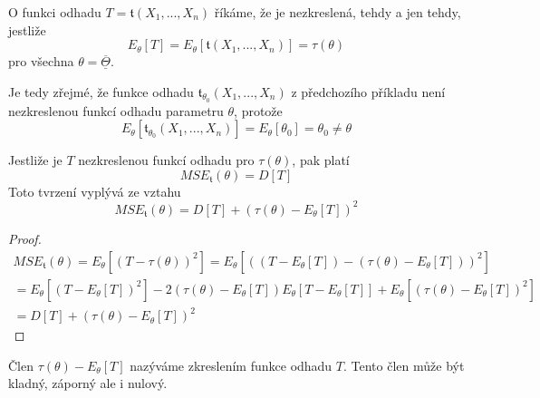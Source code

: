 \begin{definition}
O funkci odhadu $T = \mathfrak{t}(X_1, ..., X_n)$ říkáme, že je nezkreslená, tehdy a jen tehdy, jestliže
\begin{equation*}
E_{\theta}[T] = E_{\theta}[\mathfrak{t}(X_1, ..., X_n)] = \tau(\theta)
\end{equation*}
pro všechna $\theta = \overline{\underline{\Theta}}$.
\end{definition}

\begin{example}
Je tedy zřejmé, že funkce odhadu $\mathfrak{t}_{\theta_0}(X_1, ..., X_n)$ z předchozího příkladu není nezkreslenou funkcí odhadu parametru $\theta$, protože
\begin{equation*}
E_{\theta}[\mathfrak{t}_{\theta_0}(X_1, ..., X_n)] = E_{\theta}[\theta_0] = \theta_0 \neq \theta
\end{equation*}
\end{example}

\begin{corollary}
Jestliže je $T$ nezkreslenou funkcí odhadu pro $\tau(\theta)$, pak platí
\begin{equation*}
MSE_{\mathfrak{t}}(\theta) = D[T]
\end{equation*}
Toto tvrzení vyplývá ze vztahu
\begin{equation*}
MSE_{\mathfrak{t}}(\theta) = D[T] + (\tau(\theta) - E_{\theta}[T])^2
\end{equation*}
\end{corollary}

\begin{proof}
\begin{gather*}
MSE_{\mathfrak{t}}(\theta) = E_{\theta}[(T - \tau(\theta))^2] = E_{\theta}\left[\left((T - E_{\theta}[T]) - (\tau(\theta) - E_{\theta}[T])\right)^2 \right]\\
= E_{\theta}[(T - E_{\theta}[T])^2] - 2(\tau(\theta) - E_{\theta}[T])E_{\theta}[T - E_{\theta}[T]] + E_{\theta}[(\tau(\theta) - E_{\theta}[T])^2]\\
= D[T] + (\tau(\theta) - E_{\theta}[T])^2
\end{gather*}
\end{proof}

Člen $\tau(\theta) - E_{\theta}[T]$ nazýváme zkreslením funkce odhadu $T$. Tento člen může být kladný, záporný ale i nulový.

